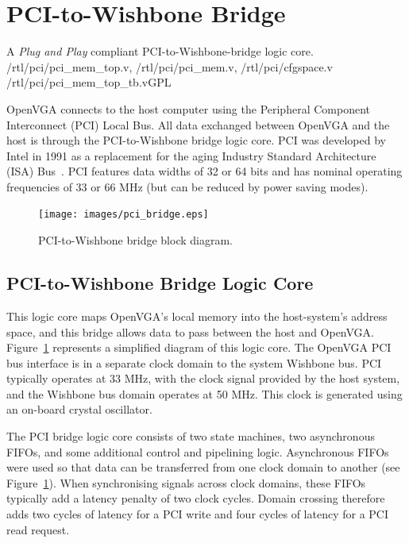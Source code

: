 \section{PCI-to-Wishbone Bridge}
\label{PCI}

{A \textit{Plug and Play} compliant PCI-to-Wishbone-bridge logic core.}
{/rtl/pci/pci\_mem\_top.v, /rtl/pci/pci\_mem.v, /rtl/pci/cfgspace.v}
{/rtl/pci/pci\_mem\_top\_tb.v}{GPL}

OpenVGA connects to the host computer using the Peripheral Component Interconnect
(PCI) Local Bus. All data exchanged between OpenVGA and the host is through the
PCI-to-Wishbone bridge logic core. PCI was developed by Intel in 1991 as a
replacement for the aging Industry Standard Architecture (ISA)
Bus~\cite{PCI_Book, PCI_Spec}. PCI features data widths of 32 or 64 bits and has
nominal operating frequencies of 33 or 66 MHz (but can be reduced by power saving
modes).

\begin{figure}[h!]
\begin{center}
\texttt{[image: images/pci\_bridge.eps]}
\end{center}
\caption[PCI-to-Wishbone bridge block diagram]{PCI-to-Wishbone bridge block
diagram.}
\label{PCI_Block_Diagram}
\end{figure}


\subsection{PCI-to-Wishbone Bridge Logic Core}
This logic core maps OpenVGA's local memory into the host-system's address space,
and this bridge allows data to pass between the host and OpenVGA.
Figure~\ref{PCI_Block_Diagram} represents a simplified diagram of this logic
core. The OpenVGA PCI bus interface is in a separate clock domain to the system
Wishbone bus. PCI typically operates at 33 MHz, with the clock signal provided by
the host system, and the Wishbone bus domain operates at 50 MHz. This clock is
generated using an on-board crystal oscillator.

The PCI bridge logic core consists of two state machines, two asynchronous FIFOs,
and some additional control and pipelining logic. Asynchronous FIFOs were used so
that data can be transferred from one clock domain to another (see
Figure~\ref{PCI_Block_Diagram}). When synchronising signals across clock domains,
these FIFOs typically add a latency penalty of two clock cycles. Domain crossing
therefore adds two cycles of latency for a PCI write and four cycles of latency
for a PCI read request.


